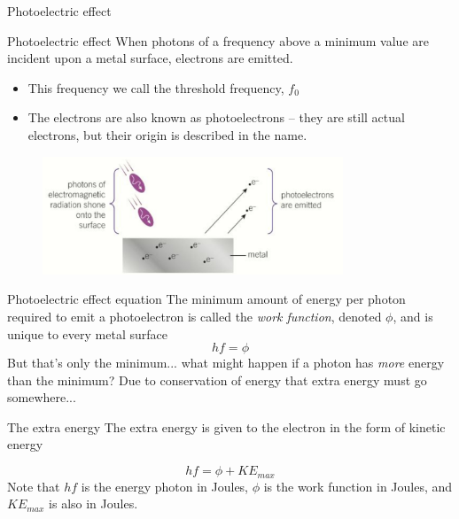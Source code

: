 \documentclass[../Main.tex]{subfiles}
\begin{document}
\begin{frame}{Photoelectric effect}
    \begin{block}{Photoelectric effect}
        When photons of a frequency above a minimum value are incident upon a metal surface, electrons are emitted. 
    \end{block}
    
    \begin{itemize}
        \item This frequency we call the threshold frequency, $f_0$
        \item The electrons are also known as photoelectrons -- they are still actual electrons, but their origin is described in the name.
    \end{itemize}
    
    \begin{figure}
        \centering
        \includegraphics[width=0.8\textwidth]{Quantum_Images/photoelectrons.jpg}
    \end{figure}
\end{frame}

\begin{frame}{Photoelectric effect equation}
    The minimum amount of energy per photon required to emit a photoelectron is called the \emph{work function}, denoted $\phi$, and is unique to every metal surface
    \begin{equation*}
        hf = \phi 
    \end{equation*}
    But that's only the minimum... what might happen if a photon has \emph{more} energy than the minimum? Due to conservation of energy that extra energy must go somewhere... \pause
    
    \begin{block}{The extra energy}
    The extra energy is given to the electron in the form of kinetic energy
    \end{block}
    \begin{equation*}
        hf = \phi + KE_{max}
    \end{equation*}
    Note that $hf$ is the energy photon in Joules, $\phi$ is the work function in Joules, and $KE_{max}$ is also in Joules.
\end{frame}
\end{document}
